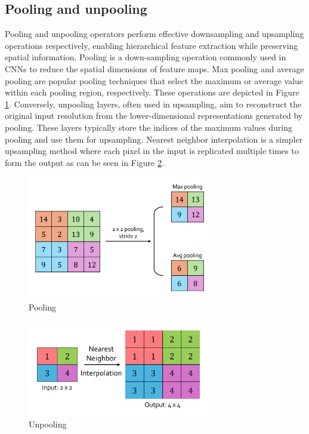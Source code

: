 \subsection{Pooling and unpooling} Pooling and unpooling operators perform effective downsampling and upsampling operations respectively, enabling hierarchical feature extraction while preserving spatial information. Pooling is a down-sampling operation commonly used in CNNs to reduce the spatial dimensions of feature maps. Max pooling and average pooling are popular pooling techniques that select the maximum or average value within each pooling region, respectively. These operations are depicted in Figure \ref{fig:Pool}. Conversely, unpooling layers, often used in upsampling, aim to reconstruct the original input resolution from the lower-dimensional representations generated by pooling. These layers typically store the indices of the maximum values during pooling and use them for upsampling. Nearest neighbor interpolation is a simpler upsampling method where each pixel in the input is replicated multiple times to form the output as can be seen in Figure \ref{fig:Unpool2}.
\begin{figure}[ht]
    \centering
    \includegraphics[width=8cm]{images/Theory-DL/Pool.png}
    \caption{Pooling}
    \label{fig:Pool}
\end{figure}
\begin{figure}[ht]
        \centering
        \includegraphics[width=8cm]{images/Theory-DL/NNUnpool.png}
        \caption{Unpooling}
        \label{fig:Unpool2}
    \end{figure}
